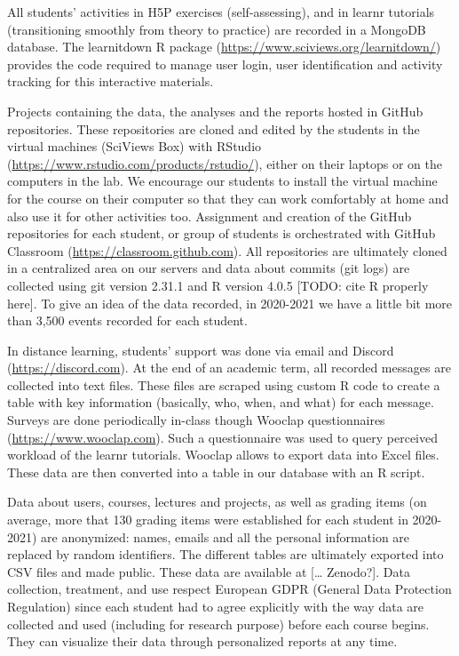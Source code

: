 \documentclass{aims}
\theoremstyle{definition}
\begin{document}
All students' activities in H5P exercises (self-assessing), and in
learnr tutorials (transitioning smoothly from theory to practice) are
recorded in a MongoDB database. The learnitdown R package
(\url{https://www.sciviews.org/learnitdown/}) provides the code required
to manage user login, user identification and activity tracking for this
interactive materials.

Projects containing the data, the analyses and the reports hosted in
GitHub repositories. These repositories are cloned and edited by the
students in the virtual machines (SciViews Box) with RStudio
(\url{https://www.rstudio.com/products/rstudio/}), either on their
laptops or on the computers in the lab. We encourage our students to
install the virtual machine for the course on their computer so that
they can work comfortably at home and also use it for other activities
too. Assignment and creation of the GitHub repositories for each
student, or group of students is orchestrated with GitHub Classroom
(\url{https://classroom.github.com}). All repositories are ultimately
cloned in a centralized area on our servers and data about commits (git
logs) are collected using git version 2.31.1 and R version 4.0.5
{[}TODO: cite R properly here{]}. To give an idea of the data recorded,
in 2020-2021 we have a little bit more than 3,500 events recorded for
each student.

In distance learning, students' support was done via email and Discord
(\url{https://discord.com}). At the end of an academic term, all
recorded messages are collected into text files. These files are scraped
using custom R code to create a table with key information (basically,
who, when, and what) for each message. Surveys are done periodically
in-class though Wooclap questionnaires (\url{https://www.wooclap.com}).
Such a questionnaire was used to query perceived workload of the learnr
tutorials. Wooclap allows to export data into Excel files. These data
are then converted into a table in our database with an R script.

Data about users, courses, lectures and projects, as well as grading
items (on average, more that 130 grading items were established for each
student in 2020-2021) are anonymized: names, emails and all the personal
information are replaced by random identifiers. The different tables are
ultimately exported into CSV files and made public. These data are
available at {[}\ldots{} Zenodo?{]}. Data collection, treatment, and use
respect European GDPR (General Data Protection Regulation) since each
student had to agree explicitly with the way data are collected and used
(including for research purpose) before each course begins. They can
visualize their data through personalized reports at any time.
\end{document}
